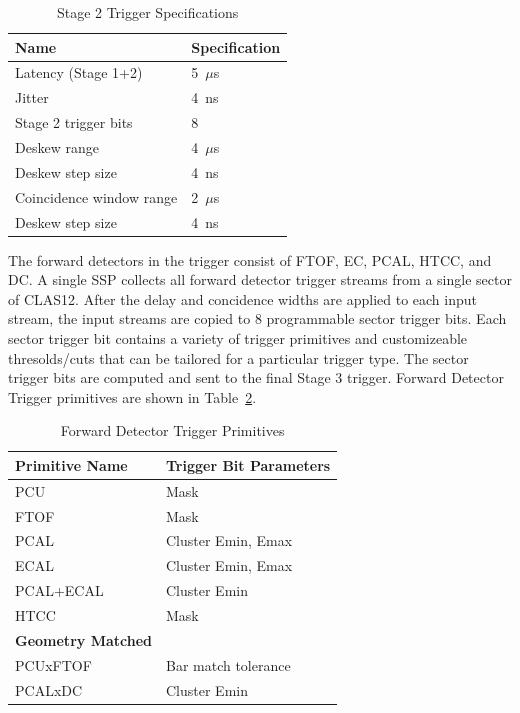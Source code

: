\begin{table}
\begin{center}
	\begin{tabular}{| l | l |}
		\hline \hline
		Name				& Specification	\\
		\hline
		Latency (Stage 1+2)		& 5~$\mu$s	\\
		Jitter				& 4~ns		\\
		Stage 2 trigger bits		& 8		\\
		Deskew range			& 4~$\mu$s	\\
		Deskew step size		& 4~ns	\\
		Coincidence window range	& 2~$\mu$s	\\
		Deskew step size		& 4~ns	\\
		\hline \hline
	\end{tabular}
\end{center}
\caption{Stage 2 Trigger Specifications}
\label{tab:stage_2_specs}
\end{table}

The forward detectors in the trigger consist of FTOF, EC, PCAL, HTCC, and DC. A single SSP collects all forward detector trigger streams from a single sector of CLAS12. After the delay and concidence widths are applied to each input stream, the input streams are copied to 8 programmable sector trigger bits. Each sector trigger bit contains a variety of trigger primitives and customizeable thresolds/cuts that can be tailored for a particular trigger type. The sector trigger bits are computed and sent to the final Stage 3 trigger. Forward Detector Trigger primitives are shown in Table~\ref{tab:fd_trig_primitives}.

\begin{table}
\begin{center}
	\begin{tabular}{| l | l |}
		\hline \hline
		Primitive Name			& Trigger Bit Parameters	\\
		\hline
		PCU     			& Mask				\\
		FTOF    			& Mask				\\
		PCAL				& Cluster Emin, Emax		\\
		ECAL				& Cluster Emin, Emax		\\
		PCAL+ECAL			& Cluster Emin			\\
		HTCC				& Mask				\\
		{\bf Geometry Matched}		&				\\
		PCUxFTOF			& Bar match tolerance		\\
		PCALxDC				& Cluster Emin			\\
		\hline \hline
	\end{tabular}
\end{center}
\caption{Forward Detector Trigger Primitives}
\label{tab:fd_trig_primitives}
\end{table}

